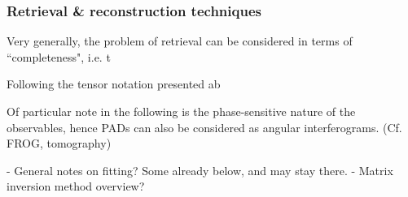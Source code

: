 \subsubsection{Retrieval \& reconstruction techniques}

Very generally, the problem of retrieval can be considered in terms of ``completeness", i.e. t

Following the tensor notation presented ab

Of particular note in the following is the phase-sensitive nature of the observables, hence PADs can also be considered as angular interferograms. (Cf. FROG, tomography)

- General notes on fitting? Some already below, and may stay there.
- Matrix inversion method overview?